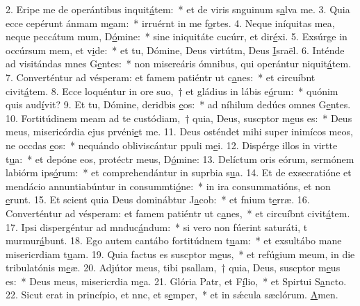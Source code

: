 2. Eripe me de operántibus inquit\uline{á}tem:~* et de viris snguinum s\uline{a}lva me.
3. Quia ecce cepérunt ánmam m\uline{e}am:~* irruérnt in me f\uline{o}rtes.
4. Neque iníquitas mea, neque peccátum mum, D\uline{ó}mine:~* sine iniquitáte cucúrr, et dir\uline{é}xi.
5. Exsúrge in occúrsum mem, et v\uline{i}de:~* et tu, Dómine, Deus virtútm, Deus \uline{I}sraël.
6. Inténde ad visitándas mnes G\uline{e}ntes:~* non misereáris ómnibus, qui operántur niquit\uline{á}tem.
7. Converténtur ad vésperam: et famem patiéntr ut c\uline{a}nes:~* et circuíbnt civit\uline{á}tem.
8. Ecce loquéntur in ore suo,~† et gládius in lábis e\uline{ó}rum:~* quónim quis aud\uline{í}vit?
9. Et tu, Dómine, deridbis \uline{e}os:~* ad níhilum dedúcs omnes G\uline{e}ntes.
10. Fortitúdinem meam ad te custódiam,~† quia, Deus, suscptor m\uline{e}us es:~* Deus meus, misericórdia ejus prvéni\uline{e}t me.
11. Deus osténdet mihi super inimícos meos, ne occdas \uline{e}os:~* nequándo obliviscántur ppuli m\uline{e}i.
12. Dispérge illos in virtte t\uline{u}a:~* et depóne eos, protéctr meus, D\uline{ó}mine:
13. Delíctum oris eórum, sermónem labiórm ips\uline{ó}rum:~* et comprehendántur in suprbia s\uline{u}a.
14. Et de exsecratióne et mendácio annuntiabúntur in consummti\uline{ó}ne:~* in ira consummatións, et non \uline{e}runt.
15. Et scient quia Deus dominábtur J\uline{a}cob:~* et fnium t\uline{e}rræ.
16. Converténtur ad vésperam: et famem patiéntr ut c\uline{a}nes,~* et circuíbnt civit\uline{á}tem.
17. Ipsi dispergéntur ad mnduc\uline{á}ndum:~* si vero non fúerint saturáti, t murmur\uline{á}bunt.
18. Ego autem cantábo fortitúdnem t\uline{u}am:~* et exsultábo mane misericrdiam t\uline{u}am.
19. Quia factus es suscptor m\uline{e}us,~* et refúgium meum, in die tribulatónis m\uline{e}æ.
20. Adjútor meus, tibi psallam,~† quia, Deus, suscptor m\uline{e}us es:~* Deus meus, misericrdia m\uline{e}a.
21. Glória Patr, et F\uline{í}lio,~* et Spirtui S\uline{a}ncto.
22. Sicut erat in princípio, et nnc, et s\uline{e}mper,~* et in sǽcula sæclórum. \uline{A}men.
